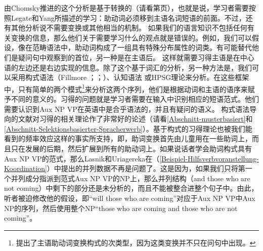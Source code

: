 \noindent
由Chomsky推进的这个分析是基于转换的（请看第\pageref{Seite-GB-Entscheidungsfragen-Englisch}页），也就是说，学习者需要按照Legate和Yang所描述的学习：助动词必须移到主语名词短语的前面。不过，还有其他分析说不需要变换或其他相当的机制。
如果我们的语言知识不包括任何有关变换的信息，那么他们关于需要学习什么的观点就是错误的。例如，我们可以假设，像在范畴语法中，助动词构成了一组具有特殊分布属性的词类。有可能替代他们是疑问句中观察到的首位，另一种是在主语后\citep[]{Villavicencio2002a}。
这样就需要习得主语是在中心语的左边还是右边实现的信息。除了这个基于词汇的分析，另一种方法是，我们可以采用构式语法（Fillmore \citeyear[]{Fillmore88a}；\citeyear{Fillmore99a}；\citealp[]{KF99a}）、认知语法 \citep[\S~9]{Dabrowska2004a}或HPSG理论\indexhpsg \citep{GSag2000a-u}来分析。在这些框架中，只有简单的两个模式\footnote{%
	 \citet{Fillmore99a}提出了主语助动词变换构式的次类型，因为这类变换并不只在问句中出现。
}来分析这两个序列，他们是根据动词和主语的语序来赋予不同的意义的。习得的问题就是学习者需要在输入中识别相应的短语范式。他们需要认识到Aux NP VP在英语中是合乎语法的，并且有疑问的语义。
构式语法导向的文献对习得的相关理论作了非常好的论述（请看\ref{Abschnitt-musterbasiert}和\ref{Abschnitt-Selektionsbasierter-Spracherwerb}）。基于构式的习得理论也被我们能看到的频率效应这样的事实所支持，即，助词变换首先由儿童用在一些助词上，而且只在发展的后期，然后扩展到所有的助动词上。如果说话者学会助词构式具有Aux NP
VP的范式，那么Lasnik和Uriagereka在（\ref{Beispiel-Hilfsverbvoranstellung-Koordination}）中提出的并列数据不再是问题了。这是因为，如果我们只将第一个并列成分指派到范式Aux NP VP的NP上，那么并列结构（and those who are not coming）中剩下的部分还是未分析的，而且不能被整合进整个句子中。由此，听者被迫修改他的假设，即“will those who are coming”对应于Aux NP VP中Aux NP的序列，然后使用整个NP“those who are coming and those who are not coming”。
